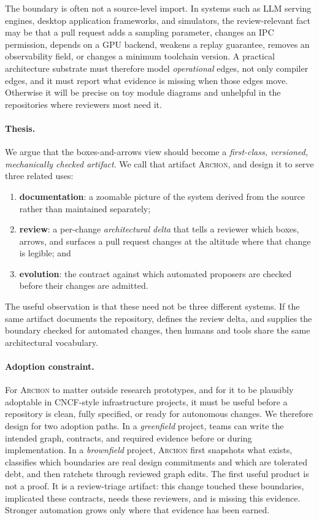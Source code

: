\documentclass[sigconf,review,anonymous]{acmart}
\theoremstyle{plain}
\theoremstyle{definition}
\begin{document}
The boundary is often not a source-level import. In systems such as LLM serving
engines, desktop application frameworks, and simulators, the review-relevant
fact may be that a pull request adds a sampling parameter, changes an IPC
permission, depends on a GPU backend, weakens a replay guarantee, removes an
observability field, or changes a minimum toolchain version. A practical
architecture substrate must therefore model \emph{operational} edges, not only
compiler edges, and it must report what evidence is missing when those edges
move. Otherwise it will be precise on toy module diagrams and unhelpful in the
repositories where reviewers most need it.

\paragraph{Thesis.}
We argue that the boxes-and-arrows view should become a \emph{first-class,
versioned, mechanically checked artifact}. We call that artifact
\textsc{Archon}, and design it to serve three related uses:
\begin{enumerate}[leftmargin=1.4em,itemsep=2pt,topsep=2pt]
\item \textbf{documentation}: a zoomable picture of the system derived from the
source rather than maintained separately;
\item \textbf{review}: a per-change \emph{architectural delta} that tells a
reviewer which boxes, arrows, and surfaces a pull request changes at the
altitude where that change is legible; and
\item \textbf{evolution}: the contract against which automated proposers are
checked before their changes are admitted.
\end{enumerate}
The useful observation is that these need not be three different systems. If the
same artifact documents the repository, defines the review delta, and supplies
the boundary checked for automated changes, then humans and tools share the same
architectural vocabulary.

\paragraph{Adoption constraint.}
For \textsc{Archon} to matter outside research prototypes, and for it to be
plausibly adoptable in CNCF-style infrastructure projects, it must be useful
before a repository is clean, fully specified, or ready for autonomous changes. We
therefore design for two adoption paths. In a \emph{greenfield} project, teams
can write the intended graph, contracts, and required evidence before or during
implementation. In a \emph{brownfield} project, \textsc{Archon} first snapshots
what exists, classifies which boundaries are real design commitments and which are
tolerated debt, and then ratchets through reviewed graph edits. The first useful
product is not a proof. It is a review-triage artifact: this change touched
these boundaries, implicated these contracts, needs these reviewers, and is
missing this evidence. Stronger automation grows only where that evidence has
been earned.
\end{document}
